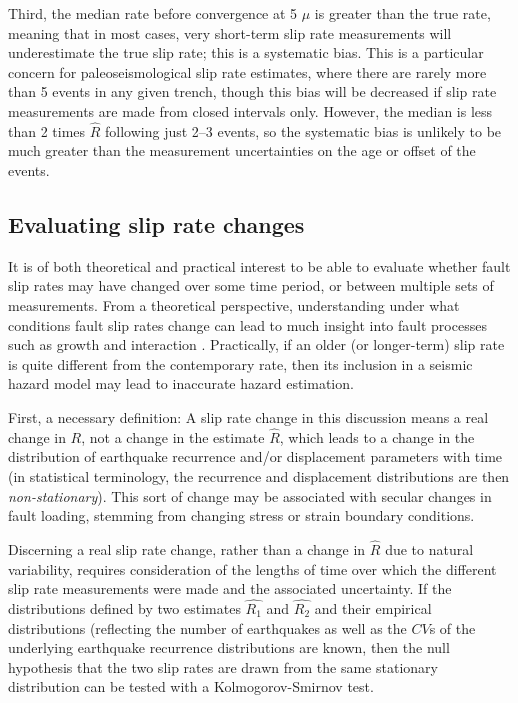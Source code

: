 \documentclass[se]{copernicus}
\begin{document}
Third, the median rate before convergence at 5 \(\mu\) is greater than
the true rate, meaning that in most cases, very short-term slip rate
measurements will underestimate the true slip rate; this is a systematic
bias. This is a particular concern for paleoseismological slip rate
estimates, where there are rarely more than 5 events in any given
trench, though this bias will be decreased if slip rate measurements are made
from closed intervals only. However, the median is less than 2 times
\(\hat{R}\) following just 2--3 events, so the systematic bias is unlikely to
be much greater than the measurement uncertainties on the age or offset of
the events.

\subsection{Evaluating slip rate
changes}\label{evaluating-slip-rate-changes}

It is of both theoretical and practical interest to be able to evaluate
whether fault slip rates may have changed over some time period, or
between multiple sets of measurements. From a theoretical perspective,
understanding under what conditions fault slip rates change can lead to
much insight into fault processes such as growth
\citep[e.g.,][]{roberts_fault_2002} and interaction
\citep[e.g.,][]{wallace_grouping_1987,dolan_long-range_2007}. Practically,
if an older (or longer-term) slip rate is quite different from the
contemporary rate, then its inclusion in a seismic hazard model may lead
to inaccurate hazard estimation.

First, a necessary definition: A slip rate change in this discussion
means a real change in \(R\), not a change in the estimate \(\hat{R}\),
which leads to a change in the distribution of earthquake recurrence
and/or displacement parameters with time (in statistical terminology,
the recurrence and displacement distributions are then
\emph{non-stationary}). This sort of change may be associated with
secular changes in fault loading, stemming from changing stress or
strain boundary conditions.

Discerning a real slip rate change, rather than a change in \(\hat{R}\)
due to natural variability, requires consideration of the lengths of
time over which the different slip rate measurements were made and the
associated uncertainty. If the distributions defined by two estimates
\(\hat{R_1}\) and \(\hat{R_2}\) and their empirical distributions
(reflecting the number of earthquakes as well as the \(CV\)s of the
underlying earthquake recurrence distributions are known, then the null
hypothesis that the two slip rates are drawn from the same stationary
distribution can be tested with a Kolmogorov-Smirnov test.
\end{document}
